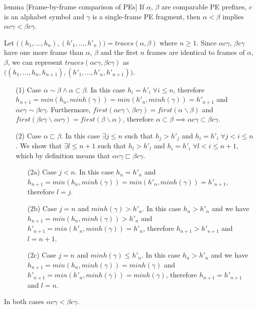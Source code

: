 \documentclass[AMA,STIX1COL]{WileyNJD-v2}
\begin{document}
\begin{theoremEnd}[restate, no link to proof, no link to theorem, category=lemma_frames]{lemma}
[Frame-by-frame comparison of PEs]
    \label{lemma_incr_cmp_frames}
    If $\alpha$, $\beta$ are comparable PE prefixes,
    $c$ is an alphabet symbol and
    $\gamma$ is a single-frame PE fragment,
    then $\alpha < \beta$ implies $\alpha c \gamma < \beta c \gamma$.
\end{theoremEnd}
\begin{proofEnd}
    Let $\big((h_1, \dots, h_n), (h'_1, \dots, h'_n)\big) = traces(\alpha, \beta)$ where $n \geq 1$.
    Since $\alpha c \gamma$, $\beta c \gamma$ have one more frame than $\alpha$, $\beta$
    and the first $n$ frames are identical to frames of $\alpha$, $\beta$,
    we can represent $traces(\alpha c \gamma, \beta c \gamma)$
    as $\big((h_1, \dots, h_n, h_{n+1}), (h'_1, \dots, h'_n, h'_{n+1})\big)$.
    \begin{itemize}[itemsep=0.2em, topsep=0.5em]
    \item[(1)]
        Case $\alpha \sim \beta \wedge \alpha \subset \beta$.
        In this case $h_i = h'_i \;\forall i \leq n$,
        therefore $h_{n+1} = min(h_n, minh(\gamma)) = min(h'_n, minh(\gamma)) = h'_{n+1}$
        and $\alpha c \gamma \sim \beta c \gamma$.
        Furthermore,
        $first (\alpha c \gamma \backslash \beta c \gamma) = first (\alpha \backslash \beta)$ and
        $first (\beta c \gamma \backslash \alpha c \gamma) = first (\beta \backslash \alpha)$,
        therefore $\alpha \subset \beta \implies \alpha c \gamma \subset \beta c \gamma$.
    \item[(2)]
        Case $\alpha \sqsubset \beta$.
        In this case $\exists j \leq n$ such that $h_j > h'_j$ and $h_i = h'_i \;\forall j < i \leq n$.
        We show that $\exists l \leq n + 1$ such that $h_l > h'_l$ and $h_i = h'_i \;\forall l < i \leq n + 1$,
        which by definition means that $\alpha c \gamma \sqsubset \beta c \gamma$.
        \begin{itemize}
        \item[(2a)]
            Case $j < n$.
            In this case $h_n = h'_n$ and
            $h_{n+1} = min(h_n, minh(\gamma)) = min(h'_n, minh(\gamma)) = h'_{n+1}$,
            therefore $l = j$.
        \item[(2b)]
            Case $j = n$ and $minh(\gamma) > h'_n$.
            In this case $h_n > h'_n$ and we have
            $h_{n+1} = min(h_n, minh(\gamma)) > h'_n$ and
            $h'_{n+1} = min(h'_n, minh(\gamma)) = h'_n$,
            therefore $h_{n+1} > h'_{n+1}$
            and $l = n + 1$.
        \item[(2c)]
            Case $j = n$ and $minh(\gamma) \leq h'_n$.
            In this case $h_n > h'_n$ and we have
            $h_{n+1} = min(h_n, minh(\gamma)) = minh(\gamma)$ and
            $h'_{n+1} = min(h'_n, minh(\gamma)) = minh(\gamma)$,
            therefore $h_{n+1} = h'_{n+1}$
            and $l = n$.
        \end{itemize}
    \end{itemize}
    In both cases $\alpha c \gamma < \beta c \gamma$.
\end{proofEnd}
\end{document}
